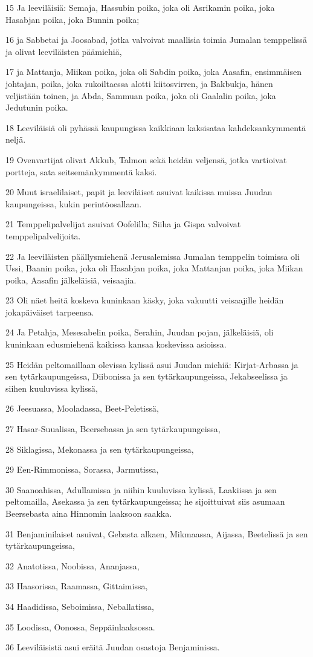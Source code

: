\par 15 Ja leeviläisiä: Semaja, Hassubin poika, joka oli Asrikamin poika, joka Hasabjan poika, joka Bunnin poika;
\par 16 ja Sabbetai ja Joosabad, jotka valvoivat maallisia toimia Jumalan temppelissä ja olivat leeviläisten päämiehiä,
\par 17 ja Mattanja, Miikan poika, joka oli Sabdin poika, joka Aasafin, ensimmäisen johtajan, poika, joka rukoiltaessa alotti kiitosvirren, ja Bakbukja, hänen veljistään toinen, ja Abda, Sammuan poika, joka oli Gaalalin poika, joka Jedutunin poika.
\par 18 Leeviläisiä oli pyhässä kaupungissa kaikkiaan kaksisataa kahdeksankymmentä neljä.
\par 19 Ovenvartijat olivat Akkub, Talmon sekä heidän veljensä, jotka vartioivat portteja, sata seitsemänkymmentä kaksi.
\par 20 Muut israelilaiset, papit ja leeviläiset asuivat kaikissa muissa Juudan kaupungeissa, kukin perintöosallaan.
\par 21 Temppelipalvelijat asuivat Oofelilla; Siiha ja Gispa valvoivat temppelipalvelijoita.
\par 22 Ja leeviläisten päällysmiehenä Jerusalemissa Jumalan temppelin toimissa oli Ussi, Baanin poika, joka oli Hasabjan poika, joka Mattanjan poika, joka Miikan poika, Aasafin jälkeläisiä, veisaajia.
\par 23 Oli näet heitä koskeva kuninkaan käsky, joka vakuutti veisaajille heidän jokapäiväiset tarpeensa.
\par 24 Ja Petahja, Mesesabelin poika, Serahin, Juudan pojan, jälkeläisiä, oli kuninkaan edusmiehenä kaikissa kansaa koskevissa asioissa.
\par 25 Heidän peltomaillaan olevissa kylissä asui Juudan miehiä: Kirjat-Arbassa ja sen tytärkaupungeissa, Diibonissa ja sen tytärkaupungeissa, Jekabseelissa ja siihen kuuluvissa kylissä,
\par 26 Jeesuassa, Mooladassa, Beet-Peletissä,
\par 27 Hasar-Suualissa, Beersebassa ja sen tytärkaupungeissa,
\par 28 Siklagissa, Mekonassa ja sen tytärkaupungeissa,
\par 29 Een-Rimmonissa, Sorassa, Jarmutissa,
\par 30 Saanoahissa, Adullamissa ja niihin kuuluvissa kylissä, Laakiissa ja sen peltomailla, Asekassa ja sen tytärkaupungeissa; he sijoittuivat siis asumaan Beersebasta aina Hinnomin laaksoon saakka.
\par 31 Benjaminilaiset asuivat, Gebasta alkaen, Mikmaassa, Aijassa, Beetelissä ja sen tytärkaupungeissa,
\par 32 Anatotissa, Noobissa, Ananjassa,
\par 33 Haasorissa, Raamassa, Gittaimissa,
\par 34 Haadidissa, Seboimissa, Neballatissa,
\par 35 Loodissa, Oonossa, Seppäinlaaksossa.
\par 36 Leeviläisistä asui eräitä Juudan osastoja Benjaminissa.

